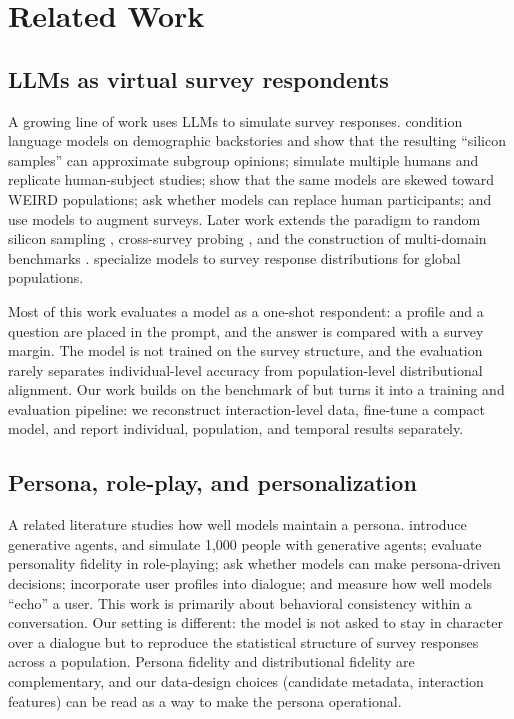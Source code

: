 \section{Related Work}\label{related-work}

\subsection{LLMs as virtual survey
respondents}\label{llms-as-virtual-survey-respondents}

A growing line of work uses LLMs to simulate survey responses.
\citet{argyle2023} condition language models on demographic backstories
and show that the resulting ``silicon samples'' can approximate subgroup
opinions; \citet{aher2023multiple} simulate multiple humans and
replicate human-subject studies; \citet{santurkar2023} show that the
same models are skewed toward WEIRD populations; \citet{dillion2023} ask
whether models can replace human participants; and \citet{kim2023} use
models to augment surveys. Later work extends the paradigm to random
silicon sampling \citep{sun2024}, cross-survey probing \citep{zhou2024},
and the construction of multi-domain benchmarks \citep{zhao2025}.
\citet{cao2025} specialize models to survey response distributions for
global populations.

Most of this work evaluates a model as a one-shot respondent: a profile
and a question are placed in the prompt, and the answer is compared with
a survey margin. The model is not trained on the survey structure, and
the evaluation rarely separates individual-level accuracy from
population-level distributional alignment. Our work builds on the
benchmark of \citet{zhao2025} but turns it into a training and
evaluation pipeline: we reconstruct interaction-level data, fine-tune a
compact model, and report individual, population, and temporal results
separately.

\subsection{Persona, role-play, and
personalization}\label{persona-role-play-and-personalization}

A related literature studies how well models maintain a persona.
\citet{park2023generative} introduce generative agents, and
\citet{park2024} simulate 1,000 people with generative agents;
\citet{wang2024} evaluate personality fidelity in role-playing;
\citet{xu2024} ask whether models can make persona-driven decisions;
\citet{salemi2024} incorporate user profiles into dialogue; and
\citet{ng2024} measure how well models ``echo'' a user. This work is
primarily about behavioral consistency within a conversation. Our
setting is different: the model is not asked to stay in character over a
dialogue but to reproduce the statistical structure of survey responses
across a population. Persona fidelity and distributional fidelity are
complementary, and our data-design choices (candidate metadata,
interaction features) can be read as a way to make the persona
operational.

